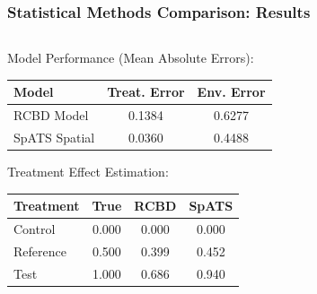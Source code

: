 \documentclass[aspectratio=43]{beamer}
\begin{document}
\begin{frame}
    \frametitle{Statistical Methods Comparison: Results}
    
    \begin{columns}
        \begin{column}{0.5\textwidth}
            \begin{block}{\small Model Performance (Mean Absolute Errors):}
                \begin{table}[h]
                    \centering
                    \scriptsize
                    \begin{tabular}{lcc}
                        \hline
                        \textbf{Model} & \textbf{Treat. Error} & \textbf{Env. Error} \\
                        \hline
                        RCBD Model & 0.1384 & 0.6277 \\
                        SpATS Spatial & 0.0360 & 0.4488 \\
                        \hline
                    \end{tabular}
                \end{table}
            \end{block}
            
            \begin{exampleblock}{\small Treatment Effect Estimation:}
                \begin{table}[h]
                    \centering
                    \scriptsize
                    \begin{tabular}{lccc}
                        \hline
                        \textbf{Treatment} & \textbf{True} & \textbf{RCBD} & \textbf{SpATS} \\
                        \hline
                        Control & 0.000 & 0.000 & 0.000 \\
                        Reference & 0.500 & 0.399 & 0.452 \\
                        Test & 1.000 & 0.686 & 0.940 \\
                        \hline
                    \end{tabular}
                \end{table}
            \end{exampleblock}
        \end{column}
        

\end{columns}
\end{frame}
\end{document}
